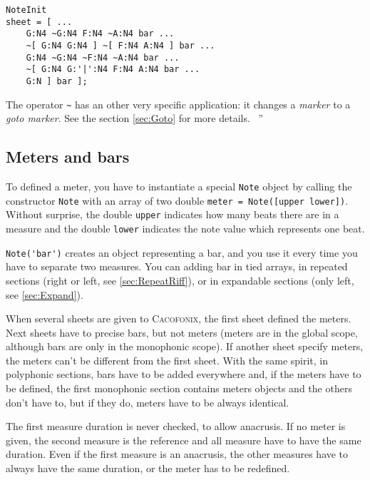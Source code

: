 \documentclass{article}
\newcommand\cacofonix{\textsc{Cacofonix}\xspace}
\newcommand\note{\lstinline!Note!\xspace}
\newenvironment{meenv}{ \par \noindent \makebox[6em][r]{ \textcolor{mecolor}{Me}: `` --~}}{~''}
\newenvironment{myselfenv}{ \par \noindent \makebox[6em][r]{ \textcolor{myselfcolor}{Myself}: `` --~}}{~''}
\newcommand{ \me }[1]{%
\begin{meenv}%
	#1%
\end{meenv} }
\newcommand{ \myself }[1]{%
\begin{myselfenv}%
	#1%
\end{myselfenv} }
\begin{document}
\begin{lstlisting}
NoteInit
sheet = [ ...
	G:N4 ~G:N4 F:N4 ~A:N4 bar ...
	~[ G:N4 G:N4 ] ~[ F:N4 A:N4 ] bar ...
	G:N4 ~G:N4 ~F:N4 ~A:N4 bar ...
	~[ G:N4 G:'|':N4 F:N4 A:N4 bar ...
	G:N ] bar ];
\end{lstlisting}

\begin{meenv}%
The operator \lstinline!~! has an other very specific application: it changes a \emph{marker} to a \emph{goto marker}. See the section \ref{sec:Goto} for more details.%
\end{meenv}

\subsection{Meters and bars}
\label{sec:MetersAndBars}

To defined a meter, you have to instantiate a special \note object by calling the constructor \lstinline!Note! with an array of two double \lstinline!meter = Note([upper lower])!. Without surprise, the double \lstinline!upper! indicates how many beats there are in a measure and the double \lstinline!lower! indicates the note value which represents one beat.

\lstinline!Note('bar')! creates an object representing a bar, and you use it every time you have to separate two measures. You can adding bar in tied arrays, in repeated sections (right or left, see \ref{sec:RepeatRiff}), or in expandable sections (only left, see \ref{sec:Expand}).

When several sheets are given to \cacofonix, the first sheet defined the meters. Next sheets have to precise bars, but not meters (meters are in the global scope, although bars are only in the monophonic scope). If another sheet specify meters, the meters can't be different from the first sheet. With the same spirit, in polyphonic sections, bars have to be added everywhere and, if the meters have to be defined, the first monophonic section contains meters objects and the others don't have to, but if they do, meters have to be always identical.

The first measure duration is never checked, to allow anacrusis. If no meter is given, the second measure is the reference and all measure have to have the same duration. Even if the first measure is an anacrusis, the other measures have to always have the same duration, or the meter has to be redefined.
\end{document}
